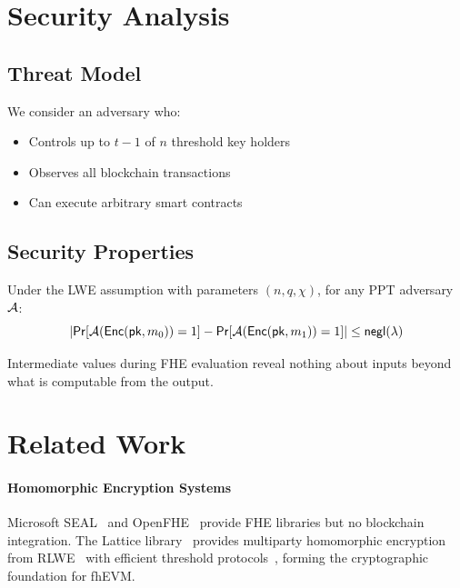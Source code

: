 \documentclass{../shared/luxfhe}
\begin{document}
\section{Security Analysis}

\subsection{Threat Model}

We consider an adversary who:
\begin{itemize}[noitemsep]
    \item Controls up to $t-1$ of $n$ threshold key holders
    \item Observes all blockchain transactions
    \item Can execute arbitrary smart contracts
\end{itemize}

\subsection{Security Properties}

\begin{theorem}
Under the LWE assumption with parameters $(n, q, \chi)$, for any PPT adversary $\mathcal{A}$:
\[
\left| \mathsf{Pr}[\mathcal{A}(\mathsf{Enc}(\mathsf{pk}, m_0)) = 1] - \mathsf{Pr}[\mathcal{A}(\mathsf{Enc}(\mathsf{pk}, m_1)) = 1] \right| \leq \mathsf{negl}(\lambda)
\]
\end{theorem}

\begin{theorem}
Intermediate values during FHE evaluation reveal nothing about inputs beyond what is computable from the output.
\end{theorem}

\section{Related Work}

\paragraph{Homomorphic Encryption Systems}
Microsoft SEAL~\cite{seal} and OpenFHE~\cite{openfhe} provide FHE libraries but no blockchain integration. The Lattice library~\cite{lattice} provides multiparty homomorphic encryption from RLWE~\cite{mhe-rlwe} with efficient threshold protocols~\cite{threshold-rlwe}, forming the cryptographic foundation for fhEVM.
\end{document}
